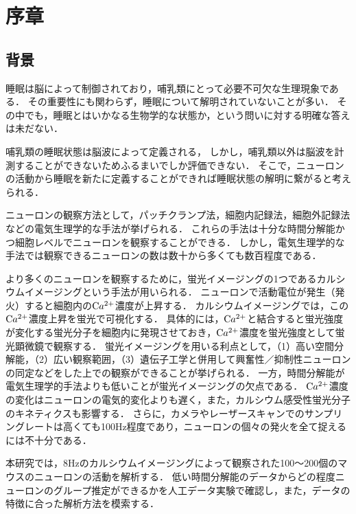 \chapter{序章}
\section{背景}
睡眠は脳によって制御されており\cite{Hobson2005}，哺乳類にとって必要不可欠な生理現象である．
その重要性にも関わらず，睡眠について解明されていないことが多い．
その中でも，睡眠とはいかなる生物学的な状態か，という問いに対する明確な答えは未だない\cite{Kanda2016}．

哺乳類の睡眠状態は脳波によって定義される，
しかし，哺乳類以外は脳波を計測することができないためふるまいでしか評価できない．
そこで，ニューロンの活動から睡眠を新たに定義することができれば睡眠状態の解明に繋がると考えられる\cite{Kanda2020}．

ニューロンの観察方法として，パッチクランプ法，細胞内記録法，細胞外記録法などの電気生理学的な手法が挙げられる．
これらの手法は十分な時間分解能かつ細胞レベルでニューロンを観察することができる．
しかし，電気生理学的な手法では観察できるニューロンの数は数十から多くても数百程度である．

より多くのニューロンを観察するために，蛍光イメージングの1つであるカルシウムイメージングという手法が用いられる．
ニューロンで活動電位が発生（発火）すると細胞内の$\text Ca^{2+}$濃度が上昇する．
カルシウムイメージングでは，この$\text Ca^{2+}$濃度上昇を蛍光で可視化する．
具体的には，$\text Ca^{2+}$と結合すると蛍光強度が変化する蛍光分子を細胞内に発現させておき，$\text Ca^{2+}$濃度を蛍光強度として蛍光顕微鏡で観察する．
蛍光イメージングを用いる利点として，（1）高い空間分解能，（2）広い観察範囲，（3）遺伝子工学と併用して興奮性／抑制性ニューロンの同定などをした上での観察ができることが挙げられる．
一方，時間分解能が電気生理学的手法よりも低いことが蛍光イメージングの欠点である．
$\text Ca^{2+}$濃度の変化はニューロンの電気的変化よりも遅く，また，カルシウム感受性蛍光分子のキネティクスも影響する．
さらに，カメラやレーザースキャンでのサンプリングレートは高くても100Hz程度であり，ニューロンの個々の発火を全て捉えるには不十分である．

本研究では，8Hzのカルシウムイメージングによって観察された100〜200個のマウスのニューロンの活動を解析する．
低い時間分解能のデータからどの程度ニューロンのグループ推定ができるかを人工データ実験で確認し，また，データの特徴に合った解析方法を模索する．

